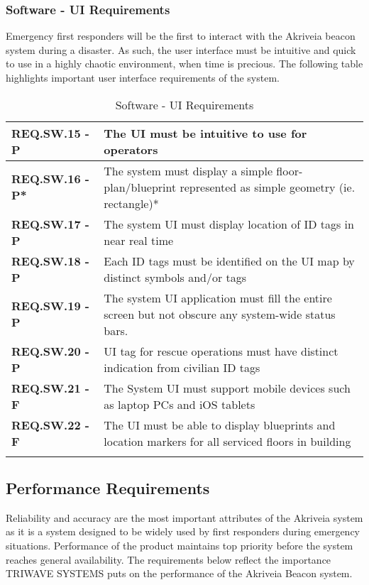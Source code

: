 \break
\subsubsection{Software - UI Requirements}
\medskip
Emergency first responders will be the first to interact with the Akriveia beacon system during a disaster. As such, the user interface must be intuitive and quick to use in a highly chaotic environment, when time is precious. The following table highlights important user interface requirements of the system.
\bigskip

\bgroup
\def\arraystretch{1.5}
\begin{longtable}[H]{ | m{3.5cm} | m{12.5cm} |}
\hline
 \textbf{REQ.SW.15 - P} & The \Gls{UI} must be intuitive to use for operators \\
\hline
 \textbf{REQ.SW.16 - P*} & The system must display a simple floor-plan/blueprint represented as simple geometry (ie. rectangle)* \\
\hline
 \textbf{REQ.SW.17 - P} & The system UI must display location of ID tags in near real time \\
\hline
 \textbf{REQ.SW.18 - P} & Each ID tags must be identified on the UI map by distinct symbols and/or tags \\
\hline
 \textbf{REQ.SW.19 - P} & The system UI application must fill the entire screen but not obscure any system-wide status bars. \\
\hline
 \textbf{REQ.SW.20 - P} & UI tag for rescue operations must have distinct indication from civilian ID tags \\
\hline
 \textbf{REQ.SW.21 - F} & The System UI must support mobile devices such as laptop PCs and \Gls{iOS} tablets \\
\hline
 \textbf{REQ.SW.22 - F} & The UI must be able to display blueprints and location markers for all serviced floors in building \\
\hline
\caption{Software - UI Requirements}
\end{longtable}
\break

\subsection{Performance Requirements}
\medskip
Reliability and accuracy are the most important attributes of the Akriveia system as it is a system designed to be widely used by first responders during emergency situations. Performance of the product maintains top priority before the system reaches general availability. The requirements below reflect the importance TRIWAVE SYSTEMS puts on the performance of the Akriveia Beacon system.


